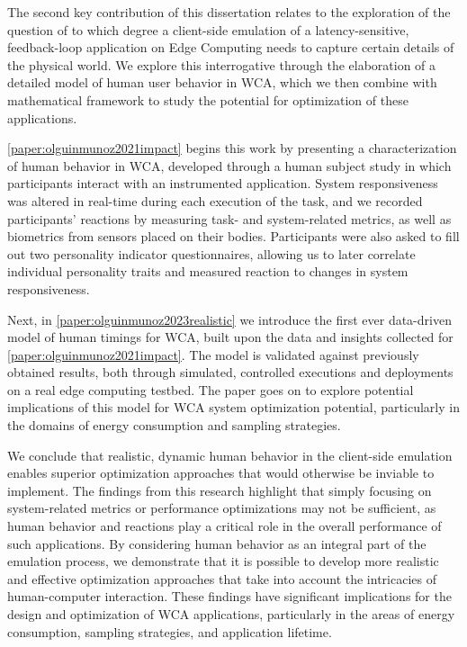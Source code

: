 \medskip

The second key contribution of this dissertation relates to the exploration of the question of to which degree a client-side emulation of a latency-sensitive, feedback-loop application on Edge Computing needs to capture certain details of the physical world.
We explore this interrogative through the elaboration of a detailed model of human user behavior in \gls{WCA}, which we then combine with mathematical framework to study the potential for optimization of these applications.

\cref{paper:olguinmunoz2021impact} begins this work by presenting a characterization of human behavior in \gls{WCA}, developed through a human subject study in which participants interact with an instrumented application.
System responsiveness was altered in real-time during each execution of the task, and we recorded participants' reactions by measuring task- and system-related metrics, as well as biometrics from sensors placed on their bodies.
Participants were also asked to fill out two personality indicator questionnaires, allowing us to later correlate individual personality traits and measured reaction to changes in system responsiveness.

Next, in \cref{paper:olguinmunoz2023realistic} we introduce the first ever data-driven model of human timings for \gls{WCA}, built upon the data and insights collected for \cref{paper:olguinmunoz2021impact}.
The model is validated against previously obtained results, both through simulated, controlled executions and deployments on a real edge computing testbed.
The paper goes on to explore potential implications of this model for \gls{WCA} system optimization potential, particularly in the domains of energy consumption and sampling strategies.

We conclude that realistic, dynamic human behavior in the client-side emulation enables superior optimization approaches that would otherwise be inviable to implement.
The findings from this research highlight that simply focusing on system-related metrics or performance optimizations may not be sufficient, as human behavior and reactions play a critical role in the overall performance of such applications.
By considering human behavior as an integral part of the emulation process, we demonstrate that it is possible to develop more realistic and effective optimization approaches that take into account the intricacies of human-computer interaction.
These findings have significant implications for the design and optimization of \gls{WCA} applications, particularly in the areas of energy consumption, sampling strategies, and application lifetime.


